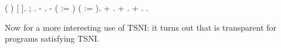 \documentclass[12pt]{report}
\begin{document}
\begin{coqdoccode}
\coqdocindent{1.00em}
 ( )  [ ].\coqdoceol
\coqdocindent{1.00em}
\coqdoctac{\ensuremath{\exists}} ; .\coqdoceol
\coqdocindent{1.00em}
- .\coqdoceol
\coqdocindent{1.00em}
-    ( := ) ( := ).\coqdoceol
\coqdocindent{2.00em}
+ .\coqdoceol
\coqdocindent{2.00em}
+ .\coqdoceol
\coqdocindent{2.00em}
+ .\coqdoceol
\coqdocnoindent
{}.\coqdoceol
\coqdocemptyline
\end{coqdoccode}
Now for a more interesting use of TSNI: it turns out that
     is transparent for programs satisfying TSNI. 
\end{document}
